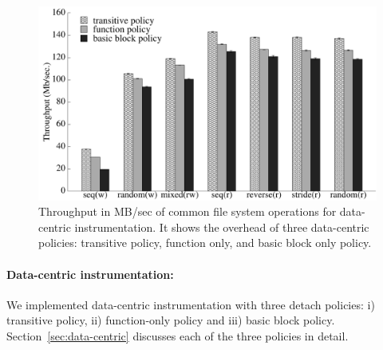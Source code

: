 \begin{figure}[t]
\begin{center}
\includegraphics[width=4.5in]{thesis_data_driven.pdf}
\end{center}
\caption[Performance impact of data centric instrumentation.]{\label{fig:watchpoint_performance_data_driven}Throughput in MB/sec of common file system operations for data-centric instrumentation. It shows the overhead of three data-centric policies: transitive policy, function only, and basic block only policy.}
\end{figure}


\paragraph{Data-centric instrumentation:}
We implemented data-centric instrumentation with three detach policies: i) transitive policy, ii) function-only policy and iii) basic block policy. Section~\ref{sec:data-centric} discusses each of the three policies in detail. %


